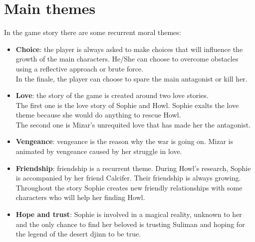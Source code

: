 \pagebreak %

\section{Main themes}

In the game story there are some recurrent moral themes:

\begin{itemize}
\item \textbf{Choice}: the player is always asked to make choices that will influence the growth of the main characters. He/She can choose to overcome obstacles using a reflective approach or brute force. \\
  In the finale, the player can choose to spare the main antagonist or kill her.

\item \textbf{Love}: the story of the game is created around two love stories. \\
  The first one is the love story of Sophie and Howl. Sophie exalts the love theme because she would do anything to rescue Howl. \\
  The second one is Mizar’s unrequited love that has made her the antagonist.

\item \textbf{Vengeance}: vengeance is the reason why the war is going on. Mizar is animated by vengeance caused by her struggle in love.


\item \textbf{Friendship}: friendship is a recurrent theme. During Howl's research, Sophie is accompanied by her friend Calcifer. Their friendship is always growing. Throughout the story Sophie creates new friendly relationships with some characters who will help her finding Howl.

\item \textbf{Hope and trust}: Sophie is involved in a magical reality, unknown to her and the only chance to find her beloved is trusting Suliman and hoping for the legend of the desert djinn  to be true.

\end{itemize}
